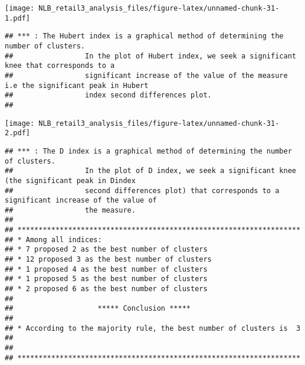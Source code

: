 \documentclass[
]{article}
\newenvironment{Shaded}{\begin{snugshade}}{\end{snugshade}}
\newcommand{\AttributeTok}[1]{\textcolor[rgb]{0.77,0.63,0.00}{#1}}
\newcommand{\DecValTok}[1]{\textcolor[rgb]{0.00,0.00,0.81}{#1}}
\newcommand{\FunctionTok}[1]{\textcolor[rgb]{0.00,0.00,0.00}{#1}}
\newcommand{\NormalTok}[1]{#1}
\newcommand{\OtherTok}[1]{\textcolor[rgb]{0.56,0.35,0.01}{#1}}
\newcommand{\SpecialCharTok}[1]{\textcolor[rgb]{0.00,0.00,0.00}{#1}}
\begin{document}
\texttt{[image: NLB\_retail3\_analysis\_files/figure-latex/unnamed-chunk-31-1.pdf]}

\begin{verbatim}
## *** : The Hubert index is a graphical method of determining the number of clusters.
##                 In the plot of Hubert index, we seek a significant knee that corresponds to a 
##                 significant increase of the value of the measure i.e the significant peak in Hubert
##                 index second differences plot. 
## 
\end{verbatim}

\texttt{[image: NLB\_retail3\_analysis\_files/figure-latex/unnamed-chunk-31-2.pdf]}

\begin{verbatim}
## *** : The D index is a graphical method of determining the number of clusters. 
##                 In the plot of D index, we seek a significant knee (the significant peak in Dindex
##                 second differences plot) that corresponds to a significant increase of the value of
##                 the measure. 
##  
## ******************************************************************* 
## * Among all indices:                                                
## * 7 proposed 2 as the best number of clusters 
## * 12 proposed 3 as the best number of clusters 
## * 1 proposed 4 as the best number of clusters 
## * 1 proposed 5 as the best number of clusters 
## * 2 proposed 6 as the best number of clusters 
## 
##                    ***** Conclusion *****                            
##  
## * According to the majority rule, the best number of clusters is  3 
##  
##  
## *******************************************************************
\end{verbatim}

\begin{Shaded}
\end{Shaded}
\end{document}
